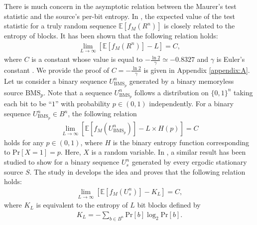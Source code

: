 \par
There is much concern in the asymptotic relation between the Maurer's test statistic and the source's per-bit entropy. In \cite{maurer1992universal}, the expected value of the test statistic for a truly random sequence $\mathbb{E}[f_M(R^n)]$ is closely related to the entropy of blocks. It has been shown that the following relation holds:
\begin{align}\label{eq:maurer_asymptotic_R}
	\lim_{L\to\infty} \left[ \mathbb{E}[f_M(R^n)] -L \right] = C,
\end{align}
where $C$ is a constant whose value is equal to $-\frac{\ln 2}{\gamma} \simeq -0.8327$ and $\gamma$ is Euler's constant \cite{hardy1979introduction}. We provide the proof of $C=-\frac{\ln 2}{\gamma}$ is given in Appendix \ref{appendix:A}. 
%
Let us consider a binary sequence $U_{\mathrm{BMS}_p}^n$ generated by a binary memoryless source $\mathrm{BMS}_p$. Note that a sequence $U_{\mathrm{BMS}_p}^n$ follows a distribution on $\{0,1\}^n$ taking each bit to be ``$1$'' with probability $p\in (0,1)$ independently. 
%
For a binary sequence $U_{\mathrm{BMS}_p}^n \in B^n$, the following relation
\begin{align}
	\lim_{L\to\infty} \left[ \mathbb{E}[f_M(U_{\mathrm{BMS}_p}^n)] -L\times H(p) \right] = C
\end{align}
holds for any $p \in (0,1)$, where $H$ is the binary entropy function corresponding to $\mathrm{Pr}[X=1]=p$. Here, $X$ is a random variable. 
%
In \cite{maurer1992universal}, a similar result has been studied to show for a binary sequence $U_s^n$ generated by every ergodic stationary source $S$. The study in \cite{coron1998accurate} develops the idea and proves that the following relation holds:
\begin{align}
	\lim_{L\to\infty} \left[ \mathbb{E}[f_M(U_s^n)] - K_L \right] = C,
\end{align}
where $K_L$ is equivalent to the entropy of $L$ bit blocks defined by
\begin{align}\label{eq:K_L}
	K_L = -\sum_{b \in B^n} \mathrm{Pr}[b] \log_2 \mathrm{Pr}[b].
\end{align}
